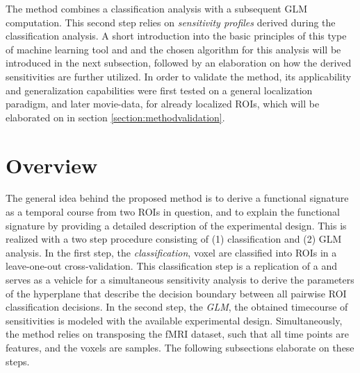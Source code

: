 \documentclass[a4paper, 12pt]{scrreprt}
\begin{document}
The method combines a classification analysis with a subsequent GLM computation. This second step relies on \textit{sensitivity profiles} derived during the classification analysis. A short introduction into the basic principles of this type of machine learning tool and and the chosen algorithm for this analysis will be introduced in the next subsection, followed by an elaboration on how the derived sensitivities are further utilized. In order to validate the method, its applicability and generalization capabilities were first tested on a general localization paradigm, and later movie-data, for already localized ROIs, which will be elaborated on in section \ref{section:methodvalidation}.


\section{Overview}
The general idea behind the proposed method is to derive a functional signature as a temporal course from two ROIs in question, and to explain the functional signature by providing a detailed description of the experimental design. This is realized with a two step procedure consisting of (1) classification and (2) GLM analysis.  In the first step, the \textit{classification}, voxel are classified into ROIs in a leave-one-out cross-validation. This classification step is a replication of a \textcite{nastase2016} and serves as a vehicle for a simultaneous sensitivity analysis to derive the parameters of the hyperplane that describe the decision boundary between all pairwise ROI classification decisions. In the second step, the \textit{GLM}, the obtained timecourse of sensitivities is modeled with the available experimental design. Simultaneously, the method relies on transposing the fMRI dataset, such that all time points are features, and the voxels are samples. The following subsections elaborate on these steps. \newline
\end{document}
